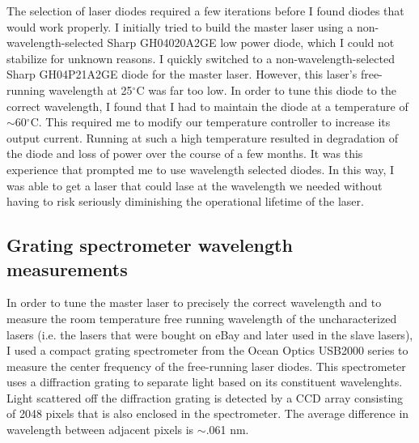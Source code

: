 
The selection of laser diodes required a few iterations before I found diodes that would work properly. I initially tried to build the master laser using a non-wavelength-selected Sharp GH04020A2GE low power diode, which I could not stabilize for unknown reasons. I quickly switched to a non-wavelength-selected Sharp GH04P21A2GE diode for the master laser. However, this laser's free-running wavelength at 25$^\circ$C was far too low. In order to tune this diode to the correct wavelength, I found that I had to maintain the diode at a temperature of $\sim$60$^\circ$C. This required me to modify our temperature controller to increase its output current. Running at such a high temperature resulted in degradation of the diode and loss of power over the course of a few months. It was this experience that prompted me to use wavelength selected diodes. In this way, I was able to get a laser that could lase at the wavelength we needed without having to risk seriously diminishing the operational lifetime of the laser.


\subsection{Grating spectrometer wavelength measurements}
\label{gratingSpectrometerWavelengthMeasurements}
In order to tune the master laser to precisely the correct wavelength and to measure the room temperature free running wavelength of the uncharacterized lasers (i.e. the lasers that were bought on eBay and later used in the slave lasers), I used a compact grating spectrometer from the Ocean Optics USB2000 series to measure the center frequency of the free-running laser diodes. This spectrometer uses a diffraction grating to separate light based on its constituent wavelenghts. Light scattered off the diffraction grating is detected by a CCD array consisting of 2048 pixels that is also enclosed in the spectrometer. The average difference in wavelength between adjacent pixels is $\sim$.061 nm. %

